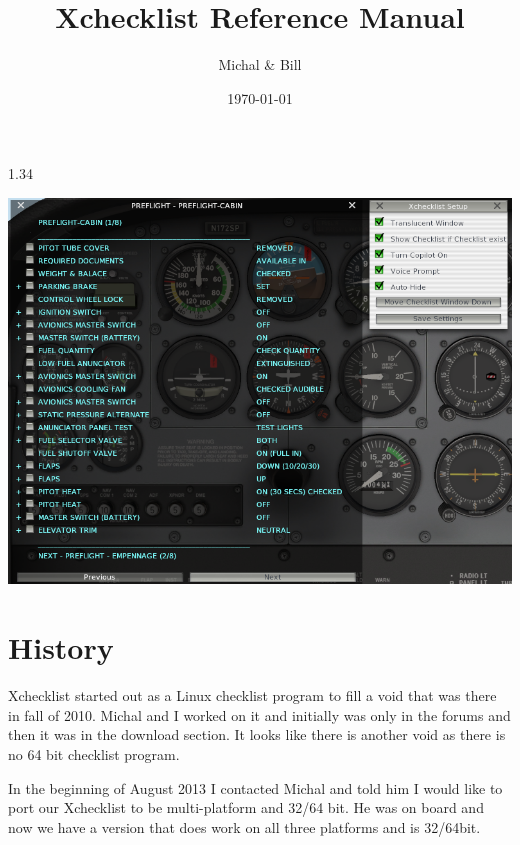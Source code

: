 \documentclass[11pt,parskip=half,a4paper]{scrartcl}
\begin{document}
\title{Xchecklist Reference Manual}
\author{Michal \& Bill}
\date{\today}

\maketitle

\begin{center}
1.34
\end{center}

\vspace{2cm}


\begin{center}
\includegraphics[width=15cm]{TranslucentXchecklist.png}
\end{center}


\thispagestyle{empty}
\newpage
\verb||
\tableofcontents

\newpage
\section{History}

Xchecklist started out as a Linux checklist program to fill a void that was there in fall of 2010. Michal and I worked on it and initially was only in the forums and then it was in the download section. It looks like there is another void as there is no 64 bit checklist program. \newline

In the beginning of August 2013 I contacted Michal and told him I would like to port our Xchecklist to be multi-platform and 32/64 bit. He was on board and now we have a version that does work on all three platforms and is 32/64bit.
\end{document}
